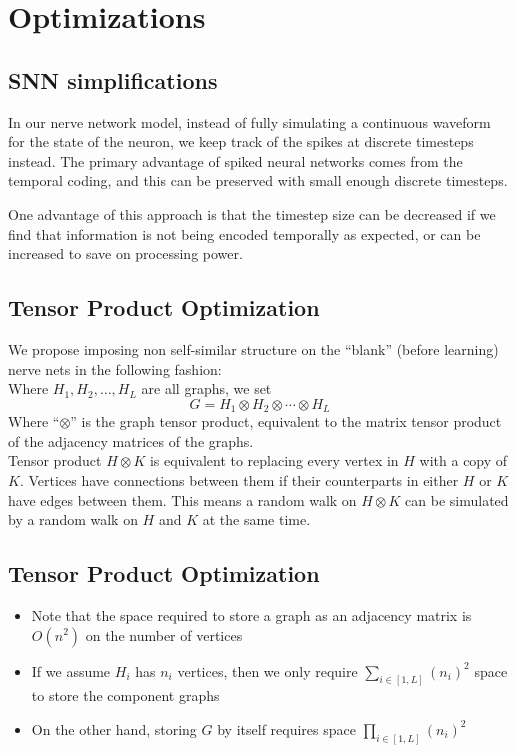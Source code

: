 \documentclass{article}
\begin{document}
\section{Optimizations}

\subsection{SNN simplifications}
In our nerve network model, instead of fully simulating a continuous waveform for the state of the neuron, we keep track of the spikes at discrete timesteps instead. The primary advantage of spiked neural networks comes from the temporal coding, and this can be preserved with small enough discrete timesteps.\newline

One advantage of this approach is that the timestep size can be decreased if we find that information is not being encoded temporally as expected, or can be increased to save on processing power.


\subsection{Tensor Product Optimization}
We propose imposing non self-similar structure on the ``blank'' (before learning) nerve nets in the following fashion:\\
Where $H_1, H_2, \ldots, H_L$ are all graphs, we set  
$$ G = H_1 \otimes H_2 \otimes \cdots \otimes H_L $$
Where ``$\otimes$'' is the graph tensor product, equivalent to the matrix tensor product of the adjacency matrices of the graphs.\\
Tensor product $H \otimes K$ is equivalent to replacing every vertex in $H$ with a copy of $K$. Vertices have connections between them if their counterparts in either $H$ or $K$ have edges between them. This means a random walk on $H \otimes K$ can be simulated by a random walk on $H$ and $K$ at the same time.


\subsection{Tensor Product Optimization}
\begin{itemize}
    \item Note that the space required to store a graph as an adjacency matrix is $O(n^2)$ on the number of vertices
    \item If we assume $H_i$ has $n_i$ vertices, then we only require $ \sum_{i \in [1,L]} (n_i)^2 $ space to store the component graphs
    \item On the other hand, storing $G$ by itself requires space $ \prod_{i \in [1,L]} (n_i)^2 $
\end{itemize}
\end{document}

